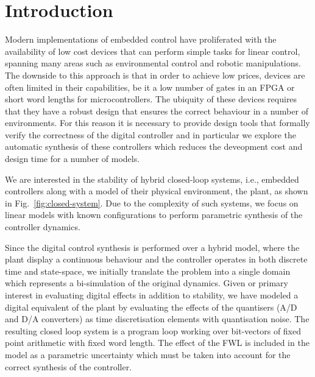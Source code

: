 \documentclass{sig-alternate-05-2015}
\begin{document}
%
%
\printccsdesc



\section{Introduction}

Modern implementations of embedded control have proliferated with the availability of low cost devices that can perform simple tasks for linear control, spanning many areas such as environmental control and robotic manipulations. The downside to this approach is that in order to achieve low prices, devices are often limited in their capabilities, be it a low number of gates in an FPGA or short word lengths for microcontrollers. The ubiquity of these devices requires that they have a robust design that ensures the correct behaviour in a number of environments.
For this reason it is necessary to provide design tools that formally verify the correctness of the digital controller and in particular we explore the automatic synthesis of these controllers which reduces the deveopment cost and design time for a number of models.

We are interested in the stability of hybrid closed-loop systems, i.e.,
embedded controllers along with a model of their physical environment, the
plant, as shown in Fig.~\ref{fig:closed-system}. Due to the complexity of such systems, we focus on linear models with known configurations to perform parametric synthesis of the controller dynamics. 

Since the digital control synthesis is performed over a hybrid model, where the plant display a continuous behaviour and the controller operates in both discrete time and state-space, we initially translate the problem into a single domain which represents a bi-simulation of the original dynamics. Given or primary interest in evaluating digital effects in addition to stability, we have modeled a digital equivalent of the plant by evaluating the effects of the quantisers (A/D and D/A converters) as time discretisation elements with quantisation noise.
The resulting closed loop system is a program loop working over bit-vectors of fixed point arithmetic with fixed word length. The effect of the FWL is included in the model as a parametric uncertainty which must be taken into account for the correct synthesis of the controller. 
\end{document}
